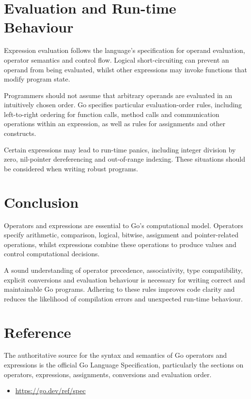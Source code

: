 \section{Evaluation and Run-time Behaviour}

Expression evaluation follows the language's specification
for operand evaluation, operator semantics and control flow.
Logical short-circuiting can prevent an operand from being
evaluated, whilst other expressions may invoke functions
that modify program state.

Programmers should not assume that arbitrary operands are
evaluated in an intuitively chosen order. Go specifies
particular evaluation-order rules, including left-to-right
ordering for function calls, method calls and communication
operations within an expression, as well as rules for
assignments and other constructs.

Certain expressions may lead to run-time panics, including
integer division by zero, nil-pointer dereferencing and
out-of-range indexing. These situations should be considered
when writing robust programs.

\section{Conclusion}

Operators and expressions are essential to Go's computational
model. Operators specify arithmetic, comparison, logical,
bitwise, assignment and pointer-related operations, whilst
expressions combine these operations to produce values and
control computational decisions.

A sound understanding of operator precedence, associativity,
type compatibility, explicit conversions and evaluation
behaviour is necessary for writing correct and maintainable
Go programs. Adhering to these rules improves code clarity
and reduces the likelihood of compilation errors and
unexpected run-time behaviour.

\section{Reference}

The authoritative source for the syntax and semantics of
Go operators and expressions is the official Go Language
Specification, particularly the sections on operators,
expressions, assignments, conversions and evaluation order.

\begin{itemize}
    \item \url{https://go.dev/ref/spec}
\end{itemize}

